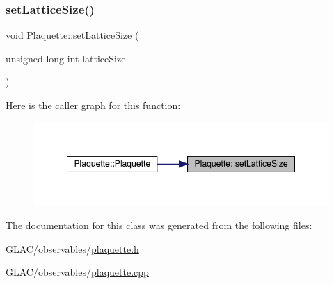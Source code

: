 \subsubsection{\texorpdfstring{setLatticeSize()}{setLatticeSize()}}
{\footnotesize\ttfamily void Plaquette\+::set\+Lattice\+Size (\begin{DoxyParamCaption}\item[{unsigned long int}]{lattice\+Size }\end{DoxyParamCaption})}

Here is the caller graph for this function\+:\nopagebreak
\begin{figure}[H]
\begin{center}
\leavevmode
\includegraphics[width=348pt]{class_plaquette_a011e1ca450fb40273ec8efa6d094c279_icgraph}
\end{center}
\end{figure}


The documentation for this class was generated from the following files\+:\begin{DoxyCompactItemize}
\item 
G\+L\+A\+C/observables/\mbox{\hyperlink{plaquette_8h}{plaquette.\+h}}\item 
G\+L\+A\+C/observables/\mbox{\hyperlink{plaquette_8cpp}{plaquette.\+cpp}}\end{DoxyCompactItemize}
